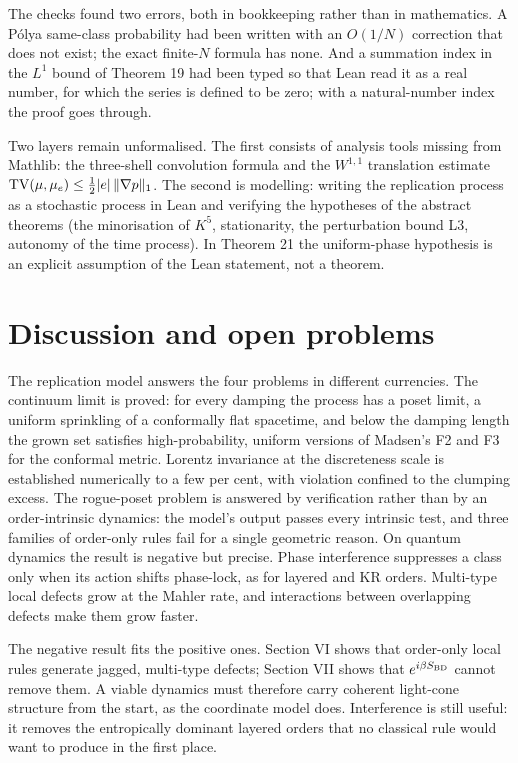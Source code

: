 The checks found two errors, both in bookkeeping rather than
in mathematics. A Pólya same-class probability had been
written with an \(O(1/N)\) correction that does not exist;
the exact finite-\(N\) formula has none. And a summation
index in the \(L^1\) bound of Theorem 19 had been typed so
that Lean read it as a real number, for which the series is
defined to be zero; with a natural-number index the proof
goes through.

Two layers remain unformalised. The first consists of
analysis tools missing from Mathlib: the three-shell
convolution formula and the \(W^{1,1}\) translation estimate
\({\rm TV}(\mu,\mu_e)\le\tfrac12|e|\,\|\nabla p\|_1\). The
second is modelling: writing the replication process as a
stochastic process in Lean and verifying the hypotheses of
the abstract theorems (the minorisation of \(K^5\),
stationarity, the perturbation bound L3, autonomy of the
time process). In Theorem 21 the uniform-phase hypothesis is
an explicit assumption of the Lean statement, not a theorem.

\hypertarget{discussion-and-open-problems}{%
\section{Discussion and open
problems}\label{discussion-and-open-problems}}

The replication model answers the four problems in different
currencies. The continuum limit is proved: for every damping
the process has a poset limit, a uniform sprinkling of a
conformally flat spacetime, and below the damping length the
grown set satisfies high-probability, uniform versions of
Madsen's F2 and F3 for the conformal metric. Lorentz
invariance at the discreteness scale is established
numerically to a few per cent, with violation confined to
the clumping excess. The rogue-poset problem is answered by
verification rather than by an order-intrinsic dynamics: the
model's output passes every intrinsic test, and three
families of order-only rules fail for a single geometric
reason. On quantum dynamics the result is negative but
precise. Phase interference suppresses a class only when its
action shifts phase-lock, as for layered and KR orders.
Multi-type local defects grow at the Mahler rate, and
interactions between overlapping defects make them grow
faster.

The negative result fits the positive ones. Section VI shows
that order-only local rules generate jagged, multi-type
defects; Section VII shows that \(e^{i\beta S_{\rm BD}}\)
cannot remove them. A viable dynamics must therefore carry
coherent light-cone structure from the start, as the
coordinate model does. Interference is still useful: it
removes the entropically dominant layered orders that no
classical rule would want to produce in the first place.

